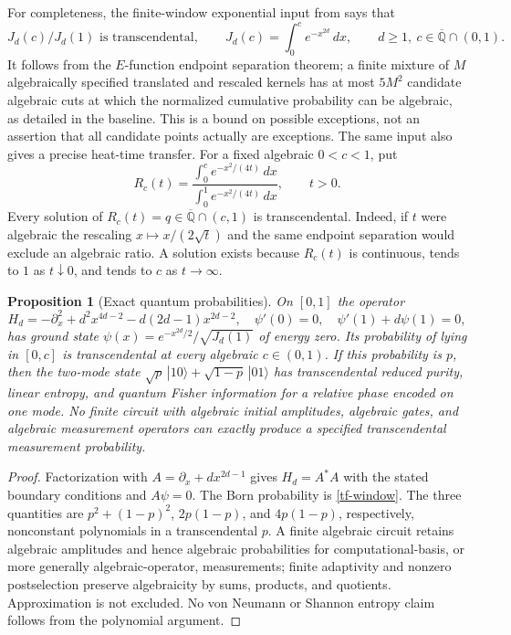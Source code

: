 \documentclass[11pt,a4paper]{article}
\newtheorem{proposition}[theorem]{Proposition}
\theoremstyle{definition}
\theoremstyle{remark}
\numberwithin{equation}{section}
\newcommand{\Qbar}{\overline{\mathbb Q}}
\begin{document}
For completeness, the finite-window exponential input from
\cite{tf-baseline} says that
\begin{equation}\label{tf-window}
 J_d(c)/J_d(1)\text{ is transcendental},\qquad
 J_d(c)=\int_0^c e^{-x^{2d}}\,dx,\qquad
 d\ge1,\ c\in\Qbar\cap(0,1).
\end{equation}
It follows from the $E$-function endpoint separation theorem; a finite
mixture of $M$ algebraically specified translated and rescaled kernels
has at most $5M^2$ candidate algebraic cuts at which the normalized
cumulative probability can be algebraic, as detailed in the baseline.
This is a bound on possible exceptions, not an assertion that all
candidate points actually are exceptions.
The same input also gives a precise heat-time transfer.  For a fixed
algebraic $0<c<1$, put
\begin{equation}\label{tf-heat}
 R_c(t)=\frac{\int_0^c e^{-x^2/(4t)}\,dx}
                   {\int_0^1 e^{-x^2/(4t)}\,dx},\qquad t>0.
\end{equation}
Every solution of $R_c(t)=q\in\Qbar\cap(c,1)$ is transcendental.
Indeed, if $t$ were algebraic the rescaling $x\mapsto x/(2\sqrt t)$
and the same endpoint separation would exclude an algebraic ratio.
A solution exists because $R_c(t)$ is continuous, tends to $1$ as
$t\downarrow0$, and tends to $c$ as $t\to\infty$.
\label{tf-heat-time}

\begin{proposition}[Exact quantum probabilities]\label{tf-quantum}
On $[0,1]$ the operator
\[
 H_d=-\partial_x^2+d^2x^{4d-2}-d(2d-1)x^{2d-2},
 \quad \psi'(0)=0,\quad \psi'(1)+d\psi(1)=0,
\]
has ground state $\psi(x)=e^{-x^{2d}/2}/\sqrt{J_d(1)}$ of energy zero.
Its probability of lying in $[0,c]$ is transcendental at every algebraic
$c\in(0,1)$.  If this probability is $p$, then the two-mode state
$\sqrt p\,|10\rangle+\sqrt{1-p}\,|01\rangle$ has transcendental reduced
purity, linear entropy, and quantum Fisher information for a relative phase encoded on one mode.
No finite circuit with algebraic initial amplitudes, algebraic gates,
and algebraic measurement operators can exactly produce a specified
transcendental measurement probability.
\end{proposition}
\begin{proof}
Factorization with $A=\partial_x+dx^{2d-1}$ gives $H_d=A^*A$ with
the stated boundary conditions and $A\psi=0$.
The Born probability is \eqref{tf-window}.
The three quantities are $p^2+(1-p)^2$, $2p(1-p)$, and $4p(1-p)$,
respectively, nonconstant polynomials in a transcendental $p$.
A finite algebraic circuit retains algebraic amplitudes and hence
algebraic probabilities for computational-basis, or more generally
algebraic-operator, measurements; finite adaptivity and nonzero postselection
preserve algebraicity by sums, products, and quotients.
Approximation is not excluded.  No von Neumann or Shannon entropy
claim follows from the polynomial argument.
\end{proof}
\end{document}
